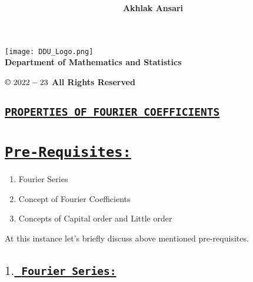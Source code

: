 \documentclass[a4paper,12pt]{article}
\title{\underline {\sc {\textbf Fourier Analysis and Summability Theory}}}
\author{\textbf{Akhlak Ansari}}
\begin{document}
    \pgfplotsset{compat=1.17}
    \color{black}

    \maketitle 

         
    
    \begin{center}
      
        \texttt{[image: DDU\_Logo.png]}\\[3mm]
        \textbf{ {\LARGE Department of Mathematics and Statistics}}
       
        \vspace{7cm}

        \textbf{$\copyright\ 2022-23$ All Rights Reserved}

    \end{center}

    \begin{center}
        \section*{\Large \underline{\texttt{\textbf{PROPERTIES OF FOURIER COEFFICIENTS}}}}
    \end{center}

    \section*{\underline{\texttt{\textbf {Pre-Requisites:}}}}
    \par

    \begin{enumerate}
        \color{black}
        \item Fourier Series
        \item Concept of Fourier Coefficients
        \item Concepts of Capital order and Little order
    \end{enumerate}


    At this instance let's briefly discuss above mentioned pre-requisites.

    \subsection*{\underline{\textbf{$1.$\ \texttt{Fourier Series:}}}}

    \paragraph*{}
\end{document}
